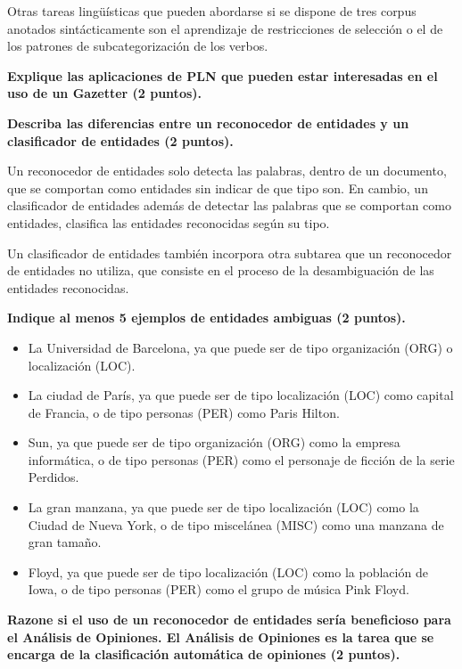 \documentclass[11pt]{exam}
\begin{document}
\begin{questions}
Otras tareas lingüísticas que pueden abordarse si se dispone de tres corpus anotados sintácticamente son el aprendizaje de restricciones de selección o el de los patrones de subcategorización de los verbos.


{\bf \question Explique las aplicaciones de PLN que pueden estar interesadas en el uso de un Gazetter (2 puntos).}

{\bf \question Describa las diferencias entre un reconocedor de entidades y un clasificador de entidades (2 puntos).}

Un reconocedor de entidades solo detecta las palabras, dentro de un documento, que se comportan como entidades sin indicar de que tipo son. En cambio, un clasificador de entidades además de detectar las palabras que se comportan como entidades, clasifica las entidades reconocidas según su tipo.

Un clasificador de entidades también incorpora otra subtarea que un reconocedor de entidades no utiliza, que consiste en el proceso de la desambiguación de las entidades reconocidas.

{\bf \question Indique al menos 5 ejemplos de entidades ambiguas (2 puntos).}

\begin{itemize}
	\item La Universidad de Barcelona, ya que puede ser de tipo organización (ORG) o localización (LOC).
	\item La ciudad de París, ya que puede ser de tipo localización (LOC) como capital de Francia, o de tipo personas (PER) como Paris Hilton.
	\item Sun, ya que puede ser de tipo organización (ORG) como la empresa informática, o de tipo personas (PER) como el personaje de ficción de la serie Perdidos.
	\item La gran manzana, ya que puede ser de tipo localización (LOC) como la Ciudad de Nueva York, o de tipo miscelánea (MISC) como una manzana de gran tamaño.
	\item Floyd, ya que puede ser de tipo localización (LOC) como la población de Iowa, o de tipo personas (PER) como el grupo de música Pink Floyd.
\end{itemize}

{\bf \question Razone si el uso de un reconocedor de entidades sería beneficioso para el Análisis de Opiniones. El Análisis de Opiniones es la tarea que se encarga de la clasificación automática de opiniones (2 puntos).}

\end{questions}
\end{document}
